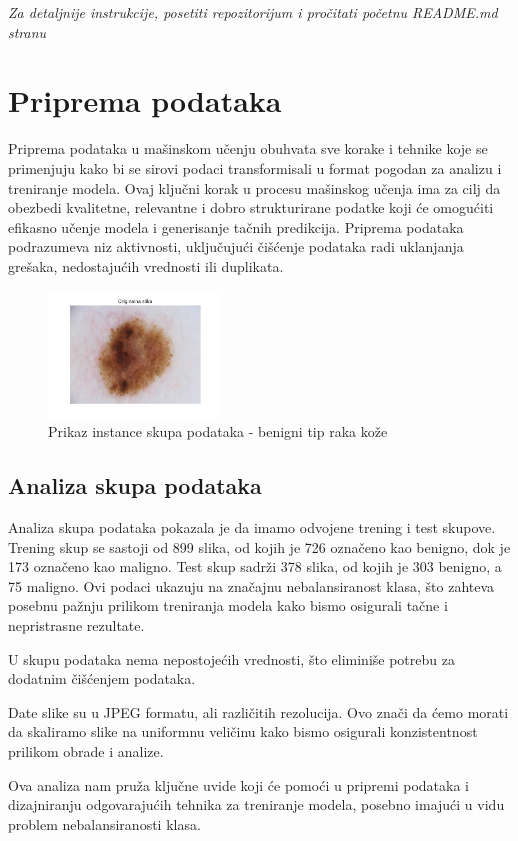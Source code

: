 \documentclass{article}
\begin{document}
\textit{Za detaljnije instrukcije, posetiti repozitorijum i pročitati početnu README.md stranu}

\section{Priprema podataka}
Priprema podataka u mašinskom učenju obuhvata sve korake i tehnike koje se primenjuju kako bi se sirovi podaci transformisali u format pogodan za analizu i treniranje modela. Ovaj ključni korak u procesu mašinskog učenja ima za cilj da obezbedi kvalitetne, relevantne i dobro strukturirane podatke koji će omogućiti efikasno učenje modela i generisanje tačnih predikcija. Priprema podataka podrazumeva niz aktivnosti, uključujući čišćenje podataka radi uklanjanja grešaka, nedostajućih vrednosti ili duplikata.

\begin{figure}[H]
    \centering
    \includegraphics[width=0.4\textwidth]{slike_raka/original_image.png} 
    \caption{Prikaz instance skupa podataka - benigni tip raka kože} 
    \label{instanca skupa podataka}
\end{figure}

\subsection{Analiza skupa podataka}

Analiza skupa podataka pokazala je da imamo odvojene trening i test skupove. Trening skup se sastoji od 899 slika, od kojih je 726 označeno kao benigno, dok je 173 označeno kao maligno. Test skup sadrži 378 slika, od kojih je 303 benigno, a 75 maligno. Ovi podaci ukazuju na značajnu nebalansiranost klasa, što zahteva posebnu pažnju prilikom treniranja modela kako bismo osigurali tačne i nepristrasne rezultate.
\par
U skupu podataka nema nepostojećih vrednosti, što eliminiše potrebu za dodatnim čišćenjem podataka. 
\par
Date slike su u JPEG formatu, ali različitih rezolucija. Ovo znači da ćemo morati da skaliramo slike na uniformnu veličinu kako bismo osigurali konzistentnost prilikom obrade i analize.
\par
Ova analiza nam pruža ključne uvide koji će pomoći u pripremi podataka i dizajniranju odgovarajućih tehnika za treniranje modela, posebno imajući u vidu problem nebalansiranosti klasa.
\end{document}
